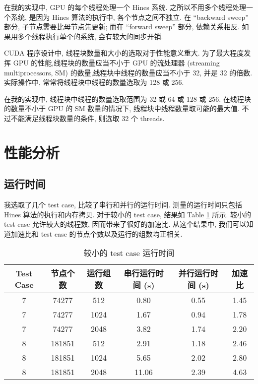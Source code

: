 \documentclass[12pt]{article}
\begin{document}
在我的实现中, GPU 的每个线程处理一个 Hines 系统. 之所以不用多个线程处理一个系统, 是因为 Hines 算法的执行中, 各个节点之间不独立. 在 ``backward sweep'' 部分, 子节点需要比母节点先更新; 而在 ``forward sweep'' 部分, 依赖关系相反. 如果用多个线程执行单个的系统, 会有较大的同步开销.

CUDA 程序设计中, 线程块数量和大小的选取对于性能意义重大. 为了最大程度发挥 GPU 的性能,线程块的数量应当不小于 GPU 的流处理器 (streaming multiprocessors, SM) 的数量,线程块中线程的数量应当不小于 32, 并是 32 的倍数. 实际操作中, 常常将线程块中线程的数量选取为 128 或 256. \cite{textbook}

在我的实现中, 线程块中线程的数量选取范围为 32 或 64 或 128 或 256. 在线程块的数量不小于 GPU 的 SM 数量的情况下, 线程块中线程数量取可能的最大值. 不过不能满足线程块数量的条件, 则选取 32 个 threads. 

\section{性能分析}

\subsection{运行时间}

我选取了几个 test case, 比较了串行和并行的运行时间. 测量的运行时间只包括 Hines 算法的执行和内存拷贝. 对于较小的 test case, 结果如 Table \ref{smallcase} 所示. 较小的 test case 允许较大的线程数, 因而带来了很好的加速比. 从这个结果中, 我们可以知道加速比和 test case 的节点个数以及运行的组数均正相关. 

\begin{table}
    \caption{较小的 test case 运行时间}
    \label{smallcase}
    \begin{center}
        \begin{tabular}{ ccc|ccc } 
         Test Case & 节点个数 & 运行组数 & 串行运行时间 (s) & 并行运行时间 (s) & 加速比 \\
         \hline
         7 & 74277 & 512 & 0.80 & 0.55 & 1.45 \\
         7 & 74277 & 1024 & 1.67 & 0.94 & 1.78 \\
         7 & 74277 & 2048 & 3.82 & 1.74 & 2.20 \\
         \hline
         8 & 181851 & 512 & 2.91 & 1.18 & 2.46 \\
         8 & 181851 & 1024 & 5.65 & 2.02 & 2.80 \\
         8 & 181851 & 2048 & 11.06 & 2.39 & 4.63 \\
        \end{tabular}
    \end{center}
\end{table}
\end{document}
